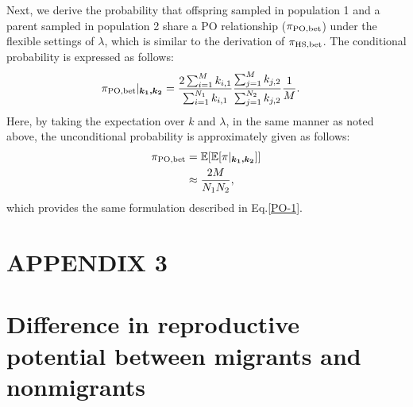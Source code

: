 \documentclass[12pt, English]{article}
\begin{document}
\begin{spacing}{1.9}
Next, we derive the probability that offspring sampled in population 1 and a parent sampled in population 2 share a PO relationship ($\pi_{\rm PO,bet}$) under the flexible settings of $\lambda$, which is similar to the derivation of $\pi_{\rm HS,bet}$. The conditional probability is expressed as follows:
\begin{align}
\pi_{\rm PO,bet} | _{\boldsymbol{k_1, k_2}} &= \frac{ 2\sum_{i=1}^M k_{i,1} } { \sum_{i=1}^{N_1} k_{i,1} } \frac{ \sum_{j=1}^M k_{j,2} } { \sum_{j=1}^{N_2} k_{j,2} } \frac{1}{M}.
\end{align}
Here, by taking the expectation over $k$ and $\lambda$, in the same manner as noted above, the unconditional probability is approximately given as follows:
\begin{align}
\pi_{\rm PO,bet} &= \mathbb{E}[\mathbb{E}[\pi | _{\boldsymbol{k_1, k_2}}]] \nonumber\\ 
&\approx  \frac{2M}{N_{1}N_{2}},
\end{align}
which provides the same formulation described in Eq.\ref{PO-1}.

\section*{APPENDIX 3}

\section*{Difference in reproductive potential between migrants and nonmigrants}


\end{spacing}
\end{document}
